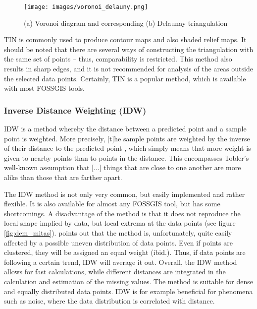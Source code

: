 \begin{figure}
	\texttt{[image: images/voronoi\_delauny.png]}
	\caption{(a) Voronoi diagram and corresponding (b) Delaunay triangulation\cite{sambridge_geophysical_1995}}
	\label{fig:voronoi_delauny}
\end{figure}

TIN is commonly used to produce contour maps and also shaded relief maps. \cite{lam_spatial_2009}
It should be noted that there are several ways of constructing the triangulation with the same set of points – thus, comparability is restricted. This method also results in sharp edges, and it is not recommended for analysis of the areas outside the selected data points. \cite{qgis_11_2021} Certainly, TIN is a popular method, which is available with most FOSSGIS tools. 

\subsubsection{Inverse Distance Weighting (IDW)}
IDW is a method whereby the distance between a predicted point and a sample point is weighted. More precisely, \ldq{}[t]he sample points are weighted by the inverse of their distance to the predicted point\rdq{} \cite[p.2]{wenjing_cao_study_2009}, which simply means that more weight is given to nearby points than to points in the distance. \cite{lam_spatial_2009} This encompasses Tobler’s well-known assumption that \ldq{}[...] things that are close to one another are more alike than those that are farther apart\rdq{}. \cite{samanta_interpolation_2012}

The IDW method is not only very common, but easily implemented and rather flexible. It is also available for almost any FOSSGIS tool, but has some shortcomings. A disadvantage of the method is that it does not reproduce the local shape implied by data, but local extrema at the data points (see figure \ref{fig:dem_mitas}). \cite{mitas_spatial_1999} \citeauthor{lam_spatial_2009} points out that the method is, unfortunately, quite easily affected by a possible uneven distribution of data points. Even if points are clustered, they will be assigned an equal weight (ibid.). Thus, if data points are following a certain trend, IDW will average it out. 
Overall, the IDW method allows for fast calculations, while different distances are integrated in the calculation and estimation of the missing values. \cite{gitta_raumliche_2016} The method is suitable for dense and equally distributed data points. \cite{wasser_going_2020} IDW is for example beneficial for phenomena such as noise, where the data distribution is correlated with distance. \cite{gis_resources_choosing_2013}

